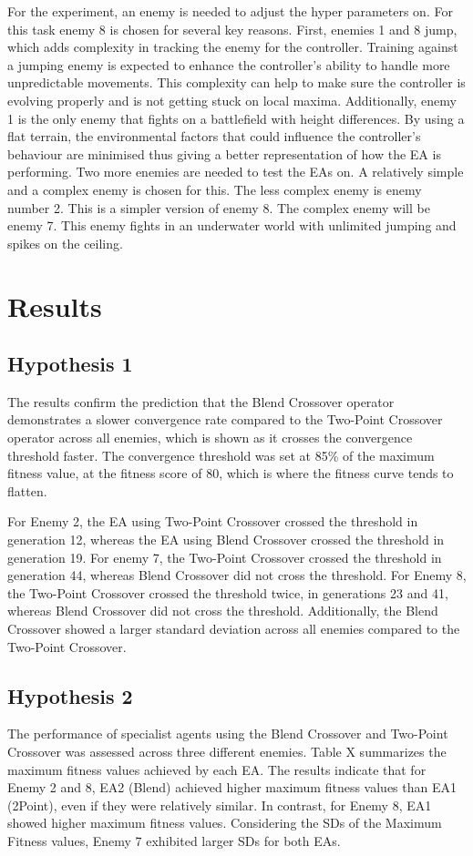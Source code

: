For the experiment, an enemy is needed to adjust the hyper parameters on.
For this task enemy 8 is chosen for several key reasons. First, enemies 1 and 8 jump, which adds complexity in tracking the enemy for the controller.
Training against a jumping enemy is expected to enhance the controller’s ability to handle more unpredictable movements.
This complexity can help to make sure the controller is evolving properly and is not getting stuck on local maxima.
Additionally, enemy 1 is the only enemy that fights on a battlefield with height differences.
By using a flat terrain, the environmental factors that could influence the controller’s behaviour are minimised thus giving a better representation of how the EA is performing.
Two more enemies are needed to test the EAs on. A relatively simple and a complex enemy is chosen for this.
The less complex enemy is enemy number 2.
This is a simpler version of enemy 8.
The complex enemy will be enemy 7.
This enemy fights in an underwater world with unlimited jumping and spikes on the ceiling.


\section{Results}
\subsection{Hypothesis 1}
The results confirm the prediction that the Blend Crossover operator demonstrates a slower convergence rate compared to the Two-Point Crossover operator across all enemies, which is shown as it crosses the convergence threshold faster.
The convergence threshold was set at 85\% of the maximum fitness value, at the fitness score of 80, which is where the fitness curve tends to flatten.

For Enemy 2, the EA using Two-Point Crossover crossed the threshold in generation 12, whereas the EA using Blend Crossover crossed the threshold in generation 19.
For enemy 7, the Two-Point Crossover crossed the threshold in generation 44, whereas Blend Crossover did not cross the threshold.
For Enemy 8, the Two-Point Crossover crossed the threshold twice, in generations 23 and 41, whereas Blend Crossover did not cross the threshold.
Additionally, the Blend Crossover showed a larger standard deviation across all enemies compared to the Two-Point Crossover.


\subsection{Hypothesis 2}
The performance of specialist agents using the Blend Crossover and Two-Point Crossover was assessed across three different enemies.
Table X summarizes the maximum fitness values achieved by each EA.
The results indicate that for Enemy 2 and 8, EA2 (Blend) achieved higher maximum fitness values than EA1 (2Point), even if they were relatively similar.
In contrast, for Enemy 8, EA1 showed higher maximum fitness values.
Considering the SDs of the Maximum Fitness values, Enemy 7 exhibited larger SDs for both EAs.

